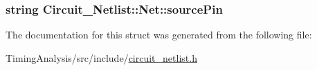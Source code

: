 \hypertarget{structCircuit__Netlist_1_1Net_a44ebd7aa36b2d81b127527a09654f99e}{
\subsubsection[{source\-Pin}]{\setlength{\rightskip}{0pt plus 5cm}string Circuit\-\_\-\-Netlist\-::\-Net\-::source\-Pin}}\label{structCircuit__Netlist_1_1Net_a44ebd7aa36b2d81b127527a09654f99e}


The documentation for this struct was generated from the following file\-:\begin{DoxyCompactItemize}
\item 
Timing\-Analysis/src/include/\hyperlink{circuit__netlist_8h}{circuit\-\_\-netlist.\-h}\end{DoxyCompactItemize}
